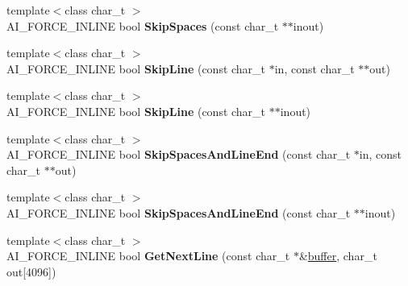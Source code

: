 \begin{DoxyCompactItemize}
\item 
\hypertarget{namespace_assimp_a05f1054ce31db2fb1ef96529e9f186fd}{{\footnotesize template$<$class char\+\_\+t $>$ }\\A\+I\+\_\+\+F\+O\+R\+C\+E\+\_\+\+I\+N\+L\+I\+N\+E bool {\bfseries Skip\+Spaces} (const char\+\_\+t $\ast$$\ast$inout)}\label{namespace_assimp_a05f1054ce31db2fb1ef96529e9f186fd}

\item 
\hypertarget{namespace_assimp_a6fd6d20616f404b05a6f90bae0ed227e}{{\footnotesize template$<$class char\+\_\+t $>$ }\\A\+I\+\_\+\+F\+O\+R\+C\+E\+\_\+\+I\+N\+L\+I\+N\+E bool {\bfseries Skip\+Line} (const char\+\_\+t $\ast$in, const char\+\_\+t $\ast$$\ast$out)}\label{namespace_assimp_a6fd6d20616f404b05a6f90bae0ed227e}

\item 
\hypertarget{namespace_assimp_ae7c92b4db3cd8a2966c709b01669835f}{{\footnotesize template$<$class char\+\_\+t $>$ }\\A\+I\+\_\+\+F\+O\+R\+C\+E\+\_\+\+I\+N\+L\+I\+N\+E bool {\bfseries Skip\+Line} (const char\+\_\+t $\ast$$\ast$inout)}\label{namespace_assimp_ae7c92b4db3cd8a2966c709b01669835f}

\item 
\hypertarget{namespace_assimp_a42855b2f408a9a00f870fc1bea2452d8}{{\footnotesize template$<$class char\+\_\+t $>$ }\\A\+I\+\_\+\+F\+O\+R\+C\+E\+\_\+\+I\+N\+L\+I\+N\+E bool {\bfseries Skip\+Spaces\+And\+Line\+End} (const char\+\_\+t $\ast$in, const char\+\_\+t $\ast$$\ast$out)}\label{namespace_assimp_a42855b2f408a9a00f870fc1bea2452d8}

\item 
\hypertarget{namespace_assimp_a36236d2b842108e2403870e394be2f6d}{{\footnotesize template$<$class char\+\_\+t $>$ }\\A\+I\+\_\+\+F\+O\+R\+C\+E\+\_\+\+I\+N\+L\+I\+N\+E bool {\bfseries Skip\+Spaces\+And\+Line\+End} (const char\+\_\+t $\ast$$\ast$inout)}\label{namespace_assimp_a36236d2b842108e2403870e394be2f6d}

\item 
\hypertarget{namespace_assimp_acbab05efb1e793c0ff7bd62c7ebbdafd}{{\footnotesize template$<$class char\+\_\+t $>$ }\\A\+I\+\_\+\+F\+O\+R\+C\+E\+\_\+\+I\+N\+L\+I\+N\+E bool {\bfseries Get\+Next\+Line} (const char\+\_\+t $\ast$\&\hyperlink{structbuffer}{buffer}, char\+\_\+t out\mbox{[}4096\mbox{]})}\label{namespace_assimp_acbab05efb1e793c0ff7bd62c7ebbdafd}


\end{DoxyCompactItemize}
